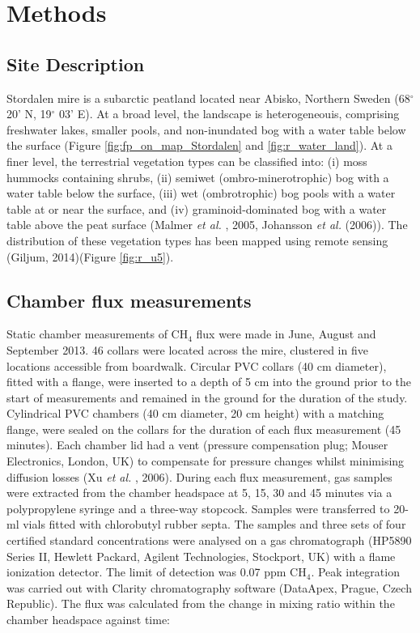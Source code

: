 \section{Methods}\label{methods}

\subsection{Site Description}\label{site-description}

Stordalen mire is a subarctic peatland located near Abisko, Northern
Sweden (68\(^{\circ}\) 20' N, 19\(^{\circ}\) 03' E). At a broad level,
the landscape is heterogeneouis, comprising freshwater lakes, smaller
pools, and non-inundated bog with a water table below the surface
(Figure \ref{fig:fp_on_map_Stordalen} and \ref{fig:r_water_land}). At a
finer level, the terrestrial vegetation types can be classified into:
(i) moss hummocks containing shrubs, (ii) semiwet (ombro-minerotrophic)
bog with a water table below the surface, (iii) wet (ombrotrophic) bog
pools with a water table at or near the surface, and (iv)
graminoid-dominated bog with a water table above the peat surface
(Malmer \emph{et al.} , 2005, Johansson \emph{et al.} (2006)). The
distribution of these vegetation types has been mapped using remote
sensing (Giljum, 2014)(Figure \ref{fig:r_u5}).

\subsection{Chamber flux measurements}\label{chamber-flux-measurements}

Static chamber measurements of CH\(_4\) flux were made in June, August
and September 2013. 46 collars were located across the mire, clustered
in five locations accessible from boardwalk. Circular PVC collars (40 cm
diameter), fitted with a flange, were inserted to a depth of 5 cm into
the ground prior to the start of measurements and remained in the ground
for the duration of the study. Cylindrical PVC chambers (40 cm diameter,
20 cm height) with a matching flange, were sealed on the collars for the
duration of each flux measurement (45 minutes). Each chamber lid had a
vent (pressure compensation plug; Mouser Electronics, London, UK) to
compensate for pressure changes whilst minimising diffusion losses (Xu
\emph{et al.} , 2006). During each flux measurement, gas samples were
extracted from the chamber headspace at 5, 15, 30 and 45 minutes via a
polypropylene syringe and a three-way stopcock. Samples were transferred
to 20-ml vials fitted with chlorobutyl rubber septa. The samples and
three sets of four certified standard concentrations were analysed on a
gas chromatograph (HP5890 Series II, Hewlett Packard, Agilent
Technologies, Stockport, UK) with a flame ionization detector. The limit
of detection was 0.07 ppm CH\(_4\). Peak integration was carried out
with Clarity chromatography software (DataApex, Prague, Czech Republic).
The flux was calculated from the change in mixing ratio within the
chamber headspace against time:

